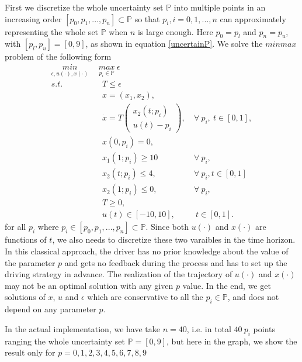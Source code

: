 \documentclass  [
  paper    = a4,
  BCOR     = 10mm,
  twoside,
  fontsize = 12pt,
  fleqn,
  toc      = bibnumbered,
  toc      = listofnumbered,
  numbers  = noendperiod,
  headings = normal,
  listof   = leveldown,
  version  = 3.03
]                                       {scrreprt}
\newcommand{\<}{\langle}
\renewcommand{\>}{\rangle}
\begin{document}
First we discretize the whole uncertainty set  $\mathbb{P}$ into multiple points in an increasing order $[p_0, p_1, ..., p_n] \subset \mathbb{P}$ so that $p_i, i =0, 1, ..., n$ can approximately representing the whole set $\mathbb{P}$ when $n$ is large enough. Here $p_0=p_l$ and $p_n= p_u$, with $[p_l, p_u] =[0,9]$, as shown in equation \ref{uncertainP}.  We solve the $minmax$ problem of the following form
\begin{subequations}
	\begin{align}
		\underset{\epsilon, u(\cdot), x(\cdot)}{min}  \ \   &  \underset{p_i \in \mathbb{P}}{max}  \  \epsilon \\ 
		s.t.  &  \ \ T  \leq \epsilon \\
		&  \ \ x = (x_1, x_2),   \label{ca_rc_x} \\ 
		& \ \  \dot{x} = T  \begin{pmatrix}  x_2(t;p_i) \\ u(t)-p_i   \end{pmatrix}, &  \ \forall \   p_i, \  t \in [0,1],  \label{ca_rc_partial} \\
		& \ \ x(0,p_i) = 0, \label{ca_rc_t0}\\
		& \ \ x_1(1;p_i) \geq 10  & \ \forall \   p_i,   \label{ca_rc_x1_t1} \\
		& \ \ x_2(t;p_i) \leq 4, &   \ \forall \   p_i,  t \in [0,1] \label{ca_rc_x2_tc} \\
		& \ \ x_2(1;p_i) \leq 0,   & \ \forall \   p_i,  \label{ca_rc_x2_t1}  \\
		& \ \ T \geq 0, \\
		& \ \ u(t) \in [-10, 10], & \ \ t \in [0,1]. 
	\end{align}
	\label{ca_rc}
\end{subequations}
for all $p_i$ where $p_i \in [p_0, p_1, ..., p_n] \subset \mathbb{P}$. Since both $u(\cdot)$ and $x(\cdot)$ are functions of $t$, we also needs to discretize these two varaibles in the time horizon. In this classical approach, the driver has no prior knowledge about the value of the parameter $p$ and gets no feedback during the process and has to set up the driving strategy in advance. The realization of the trajectory of $u(\cdot)$ and $x(\cdot)$ may not be an optimal solution with any given $p$ value. 
In the end, we get solutions of $x$, $u$ and $ \epsilon$ which are conservative to all the $p_i \in \mathbb{P}$, and does not depend on any parameter $p$. 

In the actual implementation, we have take $n=40$, i.e. in total $40 \ p_i$ points ranging the whole uncertainty set $\mathbb{P}=[0,9]$, but here in the graph, we show the result only for $p=0, 1, 2, 3, 4, 5, 6, 7, 8, 9$
\end{document}

